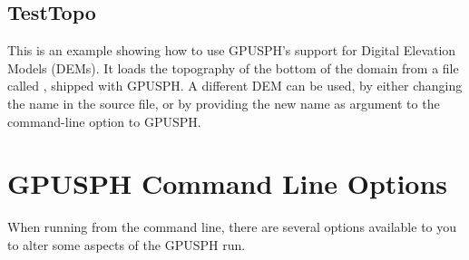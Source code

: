 \documentclass{../GPUSPHtemplate}
\begin{document}
\subsection{TestTopo}

This is an example showing how to use GPUSPH's support for Digital
Elevation Models (DEMs). It loads the topography of the bottom of the
domain from a file called , shipped with GPUSPH.
A different DEM can be used, by either changing the name in the source
 file, or by providing the new name as argument to the
 command-line option to GPUSPH.


\section{GPUSPH Command Line Options}\label{options}

When running from the command line, there are several options available
to you to alter some aspects of the GPUSPH run.
\end{document}

